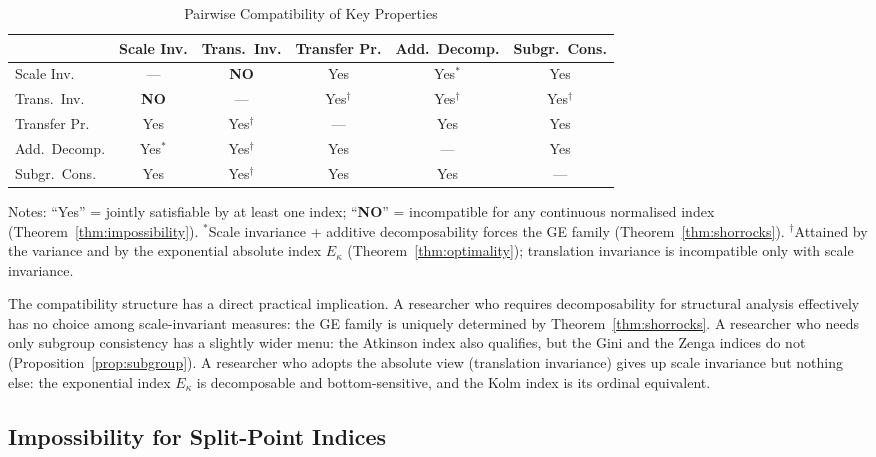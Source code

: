 \documentclass[12pt]{article}
\theoremstyle{plain}
\theoremstyle{definition}
\theoremstyle{remark}
\begin{document}
\begin{table}[H]
\centering
\caption{Pairwise Compatibility of Key Properties}
\label{tab:compatibility}
\small
\begin{tabular}{l c c c c c}
\toprule
 & Scale Inv. & Trans.\ Inv. & Transfer Pr. & Add.\ Decomp. & Subgr.\ Cons. \\
\midrule
Scale Inv.       & ---  & \textbf{NO}  & Yes & Yes$^*$ & Yes \\
Trans.\ Inv.     & \textbf{NO} & --- & Yes$^\dagger$ & Yes$^\dagger$ & Yes$^\dagger$ \\
Transfer Pr.     & Yes  & Yes$^\dagger$ & --- & Yes & Yes \\
Add.\ Decomp.    & Yes$^*$ & Yes$^\dagger$ & Yes & --- & Yes \\
Subgr.\ Cons.    & Yes  & Yes$^\dagger$ & Yes & Yes & --- \\
\bottomrule
\end{tabular}
\vspace{0.5em}

\footnotesize
Notes: ``Yes'' = jointly satisfiable by at least one index; ``\textbf{NO}'' = incompatible for any continuous normalised index (Theorem~\ref{thm:impossibility}).
$^*$Scale invariance + additive decomposability forces the GE family (Theorem~\ref{thm:shorrocks}).
$^\dagger$Attained by the variance and by the exponential absolute index $E_\kappa$ (Theorem~\ref{thm:optimality}); translation invariance is incompatible only with scale invariance.
\end{table}

The compatibility structure has a direct practical implication.
A researcher who requires decomposability for structural analysis effectively has no choice among scale-invariant measures: the GE family is uniquely determined by Theorem~\ref{thm:shorrocks}.
A researcher who needs only subgroup consistency has a slightly wider menu: the Atkinson index also qualifies, but the Gini and the Zenga indices do not (Proposition~\ref{prop:subgroup}).
A researcher who adopts the absolute view (translation invariance) gives up scale invariance but nothing else: the exponential index $E_\kappa$ is decomposable and bottom-sensitive, and the Kolm index is its ordinal equivalent.

\subsection{Impossibility for Split-Point Indices}\label{sec:zenga_impossibility}
\end{document}
